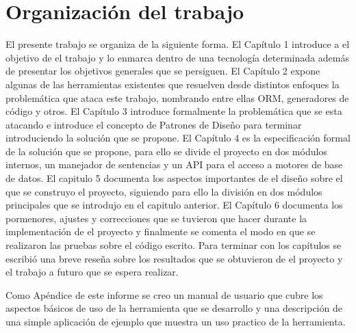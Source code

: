 \section{Organización del trabajo}
%
El presente trabajo se organiza de la siguiente forma. El Capítulo 1 introduce a el objetivo de el trabajo y lo enmarca dentro de una tecnología determinada además de presentar los objetivos generales que se persiguen. El Capítulo 2 expone algunas de las herramientas existentes que resuelven desde distintos enfoques la problemática que ataca este trabajo, nombrando entre ellas ORM, generadores de código y otros. El Capítulo 3 introduce formalmente la problemática que se esta atacando e introduce el concepto de Patrones de Diseño para terminar introduciendo la solución que se propone. El Capítulo 4 es la especificación formal de la solución que se propone, para ello se divide el proyecto en dos módulos internos, un manejador de sentencias y un API para el acceso a motores de base de datos. El capitulo 5 documenta los aspectos importantes de el diseño sobre el que se construyo el proyecto, siguiendo para ello la división en dos módulos principales que se introdujo en el capitulo anterior. El Capítulo 6 documenta los pormenores, ajustes y correcciones que se tuvieron que hacer durante la implementación de el proyecto y finalmente se comenta el modo en que se realizaron las pruebas sobre el código escrito. Para terminar con los capítulos se escribió una breve reseña sobre los resultados que se obtuvieron de el proyecto y el trabajo a futuro que se espera realizar.

Como Apéndice de este informe se creo un manual de usuario que cubre los aspectos básicos de uso de la herramienta que se desarrollo y una descripción de una simple aplicación de ejemplo que muestra un uso practico de la herramienta.